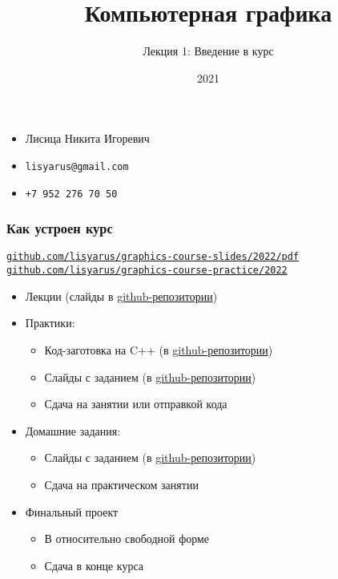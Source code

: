 \documentclass{beamer}
\title{Компьютерная графика}
\subtitle{Лекция 1: Введение в курс}
\date{2021}
\begin{document}
\frame{\titlepage}

\begin{frame}
\frametitle{}
\begin{itemize}
\item Лисица Никита Игоревич
\item \nolinkurl{lisyarus@gmail.com}
\item \nolinkurl{+7 952 276 70 50}
\end{itemize}
\end{frame}

\begin{frame}
\frametitle{Как устроен курс}
\href{https://github.com/lisyarus/graphics-course-slides/tree/master/2022/pdf}{\nolinkurl{github.com/lisyarus/graphics-course-slides/2022/pdf}}
\href{https://github.com/lisyarus/graphics-course-practice/tree/master/2022/pdf}{\nolinkurl{github.com/lisyarus/graphics-course-practice/2022}}
\pause
\begin{itemize}
\item Лекции (слайды в \href{https://github.com/lisyarus/graphics-course-slides/tree/master/2022/pdf}{github-репозитории})
\pause
\item Практики:
\pause
\begin{itemize}
\item Код-заготовка на C++ (в \href{https://github.com/lisyarus/graphics-course-practice/tree/master/2022}{github-репозитории})
\pause
\item Слайды с заданием (в \href{https://github.com/lisyarus/graphics-course-slides/tree/master/2022/pdf}{github-репозитории})
\pause
\item Сдача на занятии или отправкой кода
\end{itemize}
\pause
\item Домашние задания:
\pause
\begin{itemize}
\item Слайды с заданием (в \href{https://github.com/lisyarus/graphics-course-slides/tree/master/2022/pdf}{github-репозитории})
\pause
\item Сдача на практическом занятии 
\end{itemize}
\pause
\item Финальный проект
\begin{itemize}
\item В относительно свободной форме
\pause
\item Сдача в конце курса
\end{itemize}
\end{itemize}
\end{frame}
\end{document}
